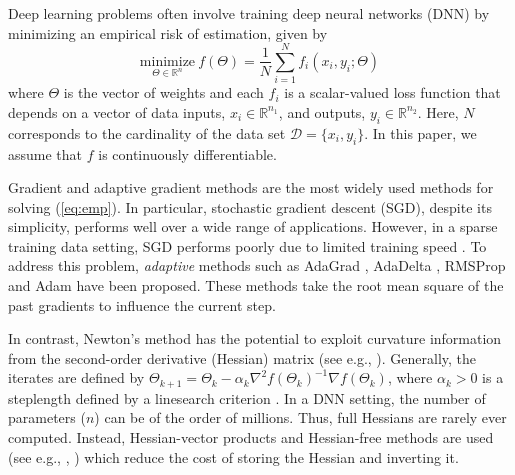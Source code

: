 Deep learning problems often involve training deep neural networks (DNN) by 
minimizing an empirical risk of estimation, given by 
\begin{equation}\label{eq:emp}
	\underset{\Theta \in \mathbb{R}^n}{\text{minimize}} 
	 \ f(\Theta)  = \frac{1}{N} \sum_{i=1}^N f_i (x_i, y_i; \Theta) 
\end{equation}
where $\Theta$ is the vector of weights and each $f_i$ is a scalar-valued loss function 
that depends on a vector of data inputs, $x_i \in \mathbb{R}^{n_1}$, and outputs, $y_i \in \mathbb{R}^{n_2}$.  
Here, $N$ corresponds to the cardinality of the data set $\mathcal{D} = \{ x_i, y_i \}$.
In this paper, we assume that $f$ is continuously differentiable.

Gradient and adaptive gradient methods are the most widely used methods for 
solving (\ref{eq:emp}). In particular, stochastic gradient descent (SGD), despite its simplicity, performs well over a wide range of applications. However, in a sparse training data setting, SGD performs poorly due to limited training speed \citep{1902.09843}. To address this problem, \textit{adaptive} methods such as AdaGrad \citep{duchi2011adaptive}, AdaDelta \citep{zeiler2012adadelta}, RMSProp \citep{hinton2012neural} and Adam \citep{kingma2014adam} have been proposed. These methods take the root mean square of the past gradients to  influence the current step. %

In contrast, Newton's method has the potential to exploit curvature information from the second-order derivative (Hessian) matrix (see e.g., \citet{GouldLRMT00}).  Generally, the iterates are defined by $\Theta_{k+1} = \Theta_k - \alpha_k \nabla^2 f(\Theta_k)^{-1} \nabla f(\Theta_k)$, where $\alpha_k > 0$ is a steplength defined by a linesearch criterion \citep{NoceWrig06}.
%
In a DNN setting, the number of parameters ($n$) can be of the order of millions. Thus, full Hessians are rarely ever computed. Instead, Hessian-vector products and Hessian-free methods are used (see e.g., \citet{martens2010deep}, \citet{ranganath2021second}) which reduce the cost of storing the Hessian and inverting it.

